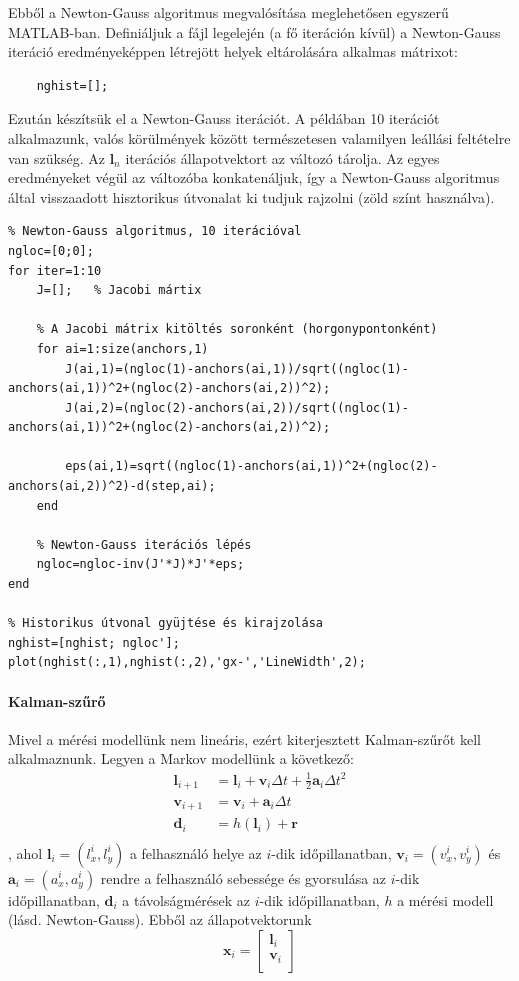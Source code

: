 \begin{answer}
	Ebből a Newton-Gauss algoritmus megvalósítása meglehetősen egyszerű MATLAB-ban. Definiáljuk a fájl legelején (a fő iteráción kívül) a Newton-Gauss iteráció eredményeképpen létrejött helyek eltárolására alkalmas mátrixot:
	\begin{lstlisting}
	nghist=[];
	\end{lstlisting}
	Ezután készítsük el a Newton-Gauss iterációt. A példában 10 iterációt alkalmazunk, valós körülmények között természetesen valamilyen leállási feltételre van szükség. Az $\mathbf{l}_n$ iterációs állapotvektort az  változó tárolja. Az egyes eredményeket végül az  változóba konkatenáljuk, így a Newton-Gauss algoritmus által visszaadott hisztorikus útvonalat ki tudjuk rajzolni (zöld színt használva).
	\begin{lstlisting}
% Newton-Gauss algoritmus, 10 iterációval
ngloc=[0;0];
for iter=1:10
	J=[];	% Jacobi mártix
	
	% A Jacobi mátrix kitöltés soronként (horgonypontonként)
	for ai=1:size(anchors,1)
		J(ai,1)=(ngloc(1)-anchors(ai,1))/sqrt((ngloc(1)-anchors(ai,1))^2+(ngloc(2)-anchors(ai,2))^2);
		J(ai,2)=(ngloc(2)-anchors(ai,2))/sqrt((ngloc(1)-anchors(ai,1))^2+(ngloc(2)-anchors(ai,2))^2);
		
		eps(ai,1)=sqrt((ngloc(1)-anchors(ai,1))^2+(ngloc(2)-anchors(ai,2))^2)-d(step,ai);
	end
	
	% Newton-Gauss iterációs lépés
	ngloc=ngloc-inv(J'*J)*J'*eps;
end

% Historikus útvonal gyüjtése és kirajzolása
nghist=[nghist; ngloc'];
plot(nghist(:,1),nghist(:,2),'gx-','LineWidth',2);
	\end{lstlisting}
	
	\paragraph{Kalman-szűrő}
	Mivel a mérési modellünk nem lineáris, ezért kiterjesztett Kalman-szűrőt kell alkalmaznunk. Legyen a Markov modellünk a következő:
	\begin{equation*}
	\begin{split}
		\mathbf{l}_{i+1} &= \mathbf{l}_i + \mathbf{v}_i\Delta t + \frac{1}{2}\mathbf{a}_i\Delta t^2 \\
		\mathbf{v}_{i+1} &= \mathbf{v}_i + \mathbf{a}_i \Delta t \\
		\mathbf{d}_i &= h(\mathbf{l}_i) + \mathbf{r}	\\
	\end{split}
	\end{equation*}
	, ahol $\mathbf{l}_i=(l_x^i,l_y^i)$ a felhasználó helye az $i$-dik időpillanatban, $\mathbf{v}_i=(v_x^i,v_y^i)$ és $\mathbf{a}_i=(a_x^i,a_y^i)$ rendre a felhasználó sebessége és gyorsulása az $i$-dik időpillanatban, $\mathbf{d}_i$ a távolságmérések az $i$-dik időpillanatban, $h$ a mérési modell (lásd. Newton-Gauss). Ebből az állapotvektorunk
	\begin{equation}
		\mathbf{x}_i=\begin{bmatrix}
			\mathbf{l}_i \\
			\mathbf{v}_i \\
		\end{bmatrix}
	\end{equation}
	

\end{answer}
